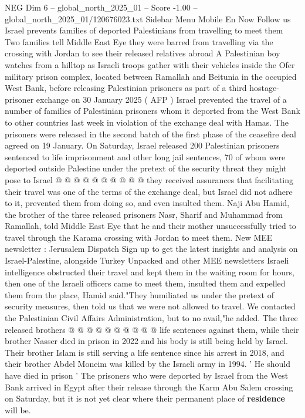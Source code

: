 \begin{textsample}{NEG Dim 6 – global\_north\_2025\_01 – Score -1.00 – global\_north\_2025\_01/120676023.txt}  \label{ex:f6_neg_180}
Sidebar Menu Mobile En Now Follow us Israel prevents families of deported Palestinians from travelling to meet them Two families tell Middle East Eye they were barred from travelling via the crossing with Jordan to see their released relatives abroad A Palestinian boy watches from a hilltop as Israeli troops gather with their vehicles inside the Ofer military prison complex, located between Ramallah and Beitunia in the occupied West Bank, before releasing Palestinian prisoners as part of a third hostage-prisoner exchange on 30 January 2025 ( AFP ) Israel prevented the travel of a number of families of Palestinian prisoners whom it deported from the West Bank to other countries last week in violation of the exchange deal with Hamas.
The prisoners were released in the second batch of the first phase of the ceasefire deal agreed on 19 January.
On Saturday, Israel released 200 Palestinian prisoners sentenced to life imprisonment and other long jail sentences, 70 of whom were deported outside Palestine under the pretext of the security threat they might pose to Israel @ @ @ @ @ @ @ @ @ @ they received assurances that facilitating their travel was one of the terms of the exchange deal, but Israel did not adhere to it, prevented them from doing so, and even insulted them.
Naji Abu Hamid, the brother of the three released prisoners Nasr, Sharif and Muhammad from Ramallah, told Middle East Eye that he and their mother unsuccessfully tried to travel through the Karama crossing with Jordan to meet them.
New MEE newsletter : Jerusalem Dispatch Sign up to get the latest insights and analysis on Israel-Palestine, alongside Turkey Unpacked and other MEE newsletters Israeli intelligence obstructed their travel and kept them in the waiting room for hours, then one of the Israeli officers came to meet them, insulted them and expelled them from the place, Hamid said."They humiliated us under the pretext of security measures, then told us that we were not allowed to travel.
We contacted the Palestinian Civil Affairs Administration, but to no avail,"he added.
The three released brothers @ @ @ @ @ @ @ @ @ @ life sentences against them, while their brother Nasser died in prison in 2022 and his body is still being held by Israel.
Their brother Islam is still serving a life sentence since his arrest in 2018, and their brother Abdel Moneim was killed by the Israeli army in 1994. ' He should have died in prison ' The prisoners who were deported by Israel from the West Bank arrived in Egypt after their release through the Karm Abu Salem crossing on Saturday, but it is not yet clear where their permanent place of \textbf{residence} will be.

\end{textsample}
